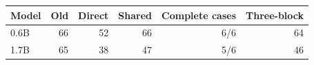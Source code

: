 \begin{tabular}{lrrrrr}\toprule
Model & Old & Direct & Shared & Complete cases & Three-block\\\midrule
0.6B & 66 & 52 & 66 & 6/6 & 64\\
1.7B & 65 & 38 & 47 & 5/6 & 46\\
\bottomrule\end{tabular}
